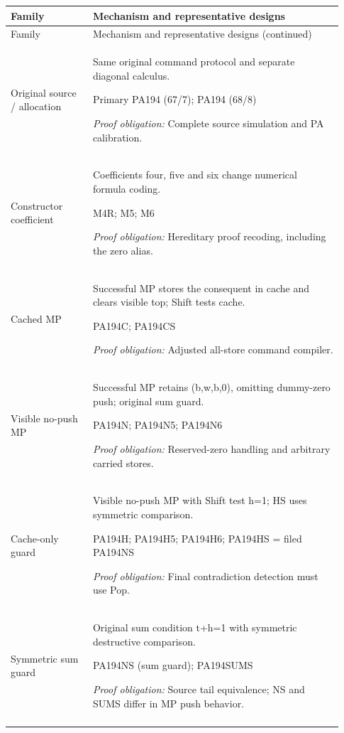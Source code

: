 \begingroup\small
\begin{longtable}{>{\raggedright\arraybackslash}p{0.23\linewidth}>{\raggedright\arraybackslash}p{0.70\linewidth}}
\toprule Family & Mechanism and representative designs\\\midrule\endfirsthead
\toprule Family & Mechanism and representative designs (continued)\\\midrule\endhead
\bottomrule\endfoot
Original source /\allowbreak{} allocation & Same original command protocol and separate diagonal calculus. \par\smallskip Primary PA194 (67/\allowbreak{}7); PA194 (68/\allowbreak{}8) \par\smallskip\emph{Proof obligation:} Complete source simulation and PA calibration.\\\addlinespace[5pt]
Constructor coefficient & Coefficients four, five and six change numerical formula coding. \par\smallskip M4R; M5; M6 \par\smallskip\emph{Proof obligation:} Hereditary proof recoding, including the zero alias.\\\addlinespace[5pt]
Cached MP & Successful MP stores the consequent in cache and clears visible top; Shift tests cache. \par\smallskip PA194C; PA194CS \par\smallskip\emph{Proof obligation:} Adjusted all-store command compiler.\\\addlinespace[5pt]
Visible no-push MP & Successful MP retains (b,w,b,0), omitting dummy-zero push; original sum guard. \par\smallskip PA194N; PA194N5; PA194N6 \par\smallskip\emph{Proof obligation:} Reserved-zero handling and arbitrary carried stores.\\\addlinespace[5pt]
Cache-only guard & Visible no-push MP with Shift test h=1; HS uses symmetric comparison. \par\smallskip PA194H; PA194H5; PA194H6; PA194HS = filed PA194NS \par\smallskip\emph{Proof obligation:} Final contradiction detection must use Pop.\\\addlinespace[5pt]
Symmetric sum guard & Original sum condition t+h=1 with symmetric destructive comparison. \par\smallskip PA194NS (sum guard); PA194SUMS \par\smallskip\emph{Proof obligation:} Source tail equivalence; NS and SUMS differ in MP push behavior.\\\addlinespace[5pt]

\end{longtable}

